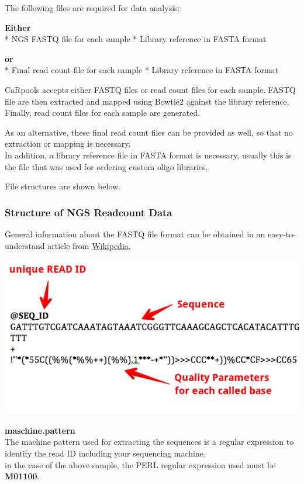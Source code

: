 \documentclass[]{article}
\begin{document}
The following files are required for data analysis:

\textbf{Either}\\
* NGS FASTQ file for each sample * Library reference in FASTA format

\textbf{or}\\
* Final read count file for each sample * Library reference in FASTA
format

CaRpools accepts either FASTQ files or read count files for each sample.
FASTQ file are then extracted and mapped using Bowtie2 against the
library reference. Finally, read count files for each sample are
generated.

As an alternative, these final read count files can be provided as well,
so that no extraction or mapping is necessary.\\
In addition, a library reference file in FASTA format is necessary,
usually this is the file that was used for ordering custom oligo
libraries.

File structures are shown below.

\subsubsection{Structure of NGS Readcount
Data}\label{structure-of-ngs-readcount-data}

General information about the FASTQ file format can be obtained in an
easy-to-understand article from
\href{https://en.wikipedia.org/wiki/FASTQ_format}{Wikipedia}.

\includegraphics{./pictures/fastq-format.png}

\textbf{maschine.pattern}\\
The machine pattern used for extracting the sequences is a regular
expression to identify the read ID including your sequencing machine.\\
in the case of the above sample, the PERL regular expression used must
be \textbf{M01100}.
\end{document}
